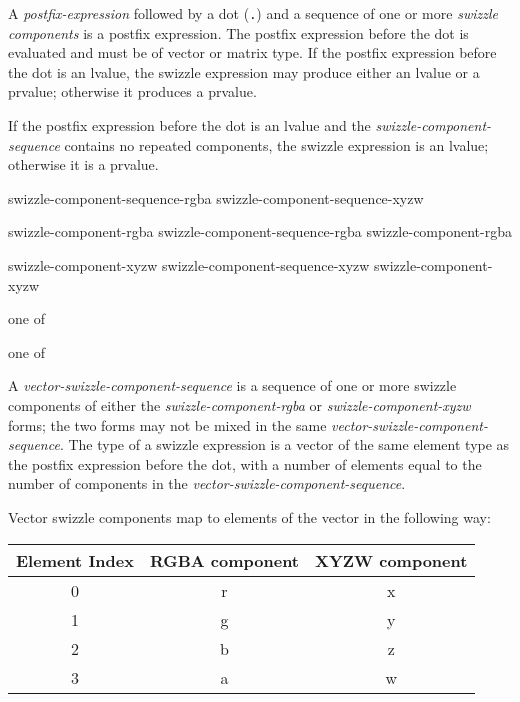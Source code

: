 \p A \textit{postfix-expression} followed by a dot (\texttt{.}) and a sequence
of one or more \textit{swizzle components} is a postfix expression. The
postfix expression before the dot is evaluated and must be of vector or matrix type.
If the postfix expression before the dot is an lvalue, the swizzle expression may
produce either an lvalue or a prvalue; otherwise it produces a prvalue.


\p If the postfix expression before the dot is
an lvalue and the \textit{swizzle-component-sequence} contains no repeated
components, the swizzle expression is an lvalue; otherwise it is a prvalue.


\begin{grammar}
  \br
  swizzle-component-sequence-rgba\br
  swizzle-component-sequence-xyzw\br

  \br
  swizzle-component-rgba\br
  swizzle-component-sequence-rgba swizzle-component-rgba\br

  \br
  swizzle-component-xyzw\br
  swizzle-component-sequence-xyzw swizzle-component-xyzw\br

   \textnormal{one of}\br
  \br

   \textnormal{one of}\br
\end{grammar}

\p A \textit{vector-swizzle-component-sequence} is a sequence of one or more swizzle
components of either the \textit{swizzle-component-rgba} or
\textit{swizzle-component-xyzw} forms; the two forms may not be mixed in the
same \textit{vector-swizzle-component-sequence}. The type of a swizzle expression is a
vector of the same element type as the postfix expression before the dot, with a
number of elements equal to the number of components in the \textit{vector-swizzle-component-sequence}. 

\p Vector swizzle components map to elements of the vector in the following way:

\begin{center}
  \begin{tabular}{|| c | c | c ||}
    \hline
    Element Index & RGBA component & XYZW component \\
    \hline
    0 & r & x \\
    1 & g & y \\
    2 & b & z \\
    3 & a & w \\
    \hline
  \end{tabular}
\end{center}

